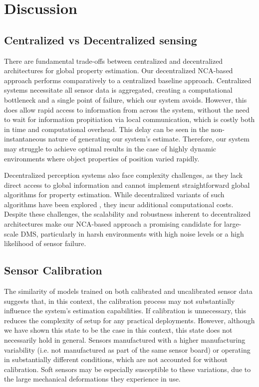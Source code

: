\section{Discussion}

\subsection{Centralized vs Decentralized sensing}

There are fundamental trade-offs between centralized and decentralized architectures for global property estimation. Our decentralized \ac{NCA}-based approach performs comparatively to a centralized baseline approach. Centralized systems necessitate all sensor data is aggregated, creating a computational bottleneck and a single point of failure, which our system avoids. However, this does allow rapid access to information from across the system, without the need to wait for information propitiation via local communication, which is costly both in time and computational overhead. This delay can be seen in the non-instantaneous nature of generating our system's estimate. Therefore, our system may struggle to achieve optimal results in the case of highly dynamic environments where object properties of position varied rapidly. 

Decentralized perception systems also face complexity challenges, as they lack direct access to global information and cannot implement straightforward global algorithms for property estimation. While decentralized variants of such algorithms have been explored \cite{bedillion_distributed_2013}, they incur additional computational costs. 
Despite these challenges, the scalability and robustness inherent to decentralized architectures make our \ac{NCA}-based approach a promising candidate for large-scale \ac{DMS}, particularly in harsh environments with high noise levels or a high likelihood of sensor failure. 

\subsection{Sensor Calibration}

 The similarity of models trained on both calibrated and uncalibrated sensor data suggests that, in this context, the calibration process may not substantially influence the system’s estimation capabilities. If calibration is unnecessary, this reduces the complexity of setup for any practical deployments. However, although we have shown this state to be the case in this context, this state does not necessarily hold in general. Sensors manufactured with a higher manufacturing variability (i.e. not manufactured as part of the same sensor board) or operating in substantially different conditions, which are not accounted for without calibration. Soft sensors may be especially susceptible to these variations,  due to the large mechanical deformations they experience in use. %





